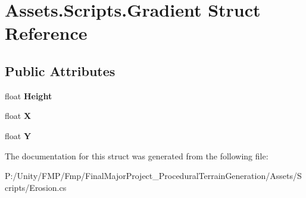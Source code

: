 \hypertarget{struct_assets_1_1_scripts_1_1_gradient}{}\section{Assets.\+Scripts.\+Gradient Struct Reference}
\label{struct_assets_1_1_scripts_1_1_gradient}
\subsection*{Public Attributes}
\begin{DoxyCompactItemize}
\item 
\mbox{\label{struct_assets_1_1_scripts_1_1_gradient_aa2db5a3bea58bbdbdcc4400539715312}} 
float {\bfseries Height}
\item 
\mbox{\label{struct_assets_1_1_scripts_1_1_gradient_ad0cdba9bbbcba8614234eb22ac55466b}} 
float {\bfseries X}
\item 
\mbox{\label{struct_assets_1_1_scripts_1_1_gradient_a9148e6f4204fb9be3a804f76b2ea57c8}} 
float {\bfseries Y}
\end{DoxyCompactItemize}


The documentation for this struct was generated from the following file\+:\begin{DoxyCompactItemize}
\item 
P\+:/\+Unity/\+F\+M\+P/\+Fmp/\+Final\+Major\+Project\+\_\+\+Procedural\+Terrain\+Generation/\+Assets/\+Scripts/Erosion.\+cs\end{DoxyCompactItemize}
